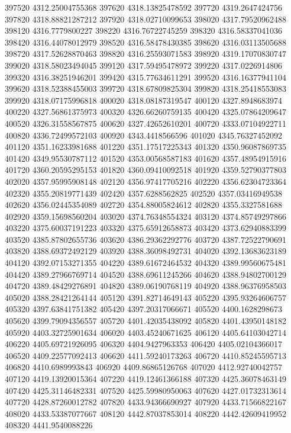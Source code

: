 {397520 4312.25004755368
397620 4318.13825478592
397720 4319.2647424756
397820 4318.88821287212
397920 4318.02710099653
398020 4317.79520962488
398120 4316.7779800227
398220 4316.76722745259
398320 4316.58337041036
398420 4316.44078012979
398520 4316.58478430385
398620 4316.03113505688
398720 4317.52628870463
398820 4316.25593071583
398920 4319.17070830747
399020 4318.58023494045
399120 4317.59495478972
399220 4317.0226914806
399320 4316.38251946201
399420 4315.77634611291
399520 4316.16377941104
399620 4318.52388455003
399720 4318.67809825304
399820 4318.25418553083
399920 4318.07175996818
400020 4318.08187319547
400120 4327.8948683974
400220 4327.56861375973
400320 4326.66260759135
400420 4325.07864209647
400520 4326.31558567875
400620 4327.42652610201
400720 4333.07104922711
400820 4336.72499572103
400920 4343.4418566596
401020 4345.76327452092
401120 4351.16233981688
401220 4351.17517225343
401320 4350.96087869735
401420 4349.95530787112
401520 4353.00568587183
401620 4357.48954915916
401720 4360.20595295153
401820 4360.09410092518
401920 4359.52790377803
402020 4357.95995908148
402120 4356.97417705216
402220 4356.62304723364
402320 4355.20819771439
402420 4357.6288562825
402520 4357.03416949538
402620 4356.02445354089
402720 4354.88005824612
402820 4355.3327581688
402920 4359.15698560204
403020 4374.76348554324
403120 4374.85749297866
403220 4375.60037191223
403320 4375.65912658873
403420 4373.62940883399
403520 4385.87802655736
403620 4386.29362292776
403720 4387.72522790691
403820 4388.69372492129
403920 4388.36098492731
404020 4392.13683623189
404120 4392.07153271355
404220 4389.61672464532
404320 4389.99560675481
404420 4389.27966769714
404520 4388.69611245266
404620 4388.94802700129
404720 4389.48429276891
404820 4389.06190768119
404920 4388.96376958503
405020 4388.28421264144
405120 4391.82714649143
405220 4395.93264606757
405320 4397.63841751382
405420 4397.20317066671
405520 4400.1628298673
405620 4399.79094356557
405720 4401.42035438092
405820 4401.43950148182
405920 4403.32725901634
406020 4403.45240671625
406120 4405.64103042714
406220 4405.69721926095
406320 4404.9427963353
406420 4405.02104366017
406520 4409.22577092413
406620 4411.59240173263
406720 4410.85245595713
406820 4410.6989993843
406920 4409.86865126768
407020 4412.92740042757
407120 4419.13920015364
407220 4419.12461366188
407320 4425.36078463149
407420 4425.31146482331
407520 4425.59980950063
407620 4427.01732313614
407720 4428.87260012782
407820 4433.94366690927
407920 4433.71566822167
408020 4433.53387077667
408120 4442.87037853014
408220 4442.42609419952
408320 4441.9540088226
}
